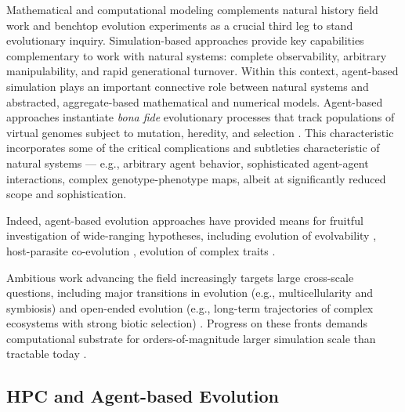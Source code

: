 Mathematical and computational modeling complements natural history field work and benchtop evolution experiments as a crucial third leg to stand evolutionary inquiry.
Simulation-based approaches provide key capabilities complementary to work with natural systems: complete observability, arbitrary manipulability, and rapid generational turnover.
Within this context, agent-based simulation plays an important connective role between natural systems and abstracted, aggregate-based mathematical and numerical models.
Agent-based approaches instantiate \textit{bona fide} evolutionary processes that track populations of virtual genomes subject to mutation, heredity, and selection \citep{pennock2007models}.
This characteristic incorporates some of the critical complications and subtleties characteristic of natural systems --- e.g., arbitrary agent behavior, sophisticated agent-agent interactions, complex genotype-phenotype maps, albeit at significantly reduced scope and sophistication.

Indeed, agent-based evolution approaches have provided means for fruitful investigation of wide-ranging hypotheses, including evolution of evolvability \citep{wilke2001evolution}, host-parasite co-evolution \citep{zaman2014coevolution}, evolution of complex traits \citep{lenski2003evolutionary}.

Ambitious work advancing the field increasingly targets large cross-scale questions, including major transitions in evolution (e.g., multicellularity and symbiosis) \citep{goldsby2020major,vostinar2021symbiosis} and open-ended evolution (e.g., long-term trajectories of complex ecosystems with strong biotic selection) \citep{stanley2019open,taylor2016open}.
Progress on these fronts demands computational substrate for orders-of-magnitude larger simulation scale than tractable today \citep{moreno2022exploring,channon2019maximum}.


\subsection{HPC and Agent-based Evolution}


